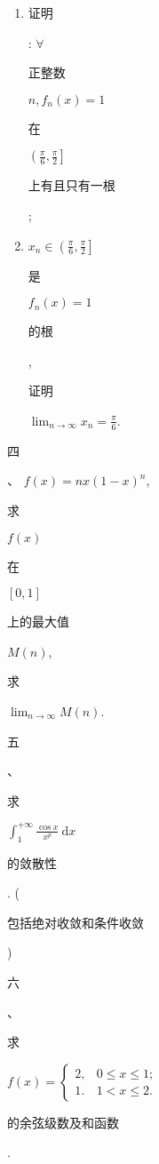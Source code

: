 \documentclass[10pt]{article}
\begin{document}
\begin{enumerate}
  \item \begin{CJK}{UTF8}{mj}证明\end{CJK}: $\forall$ \begin{CJK}{UTF8}{mj}正整数\end{CJK} $n, f_{n}(x)=1$ \begin{CJK}{UTF8}{mj}在\end{CJK} $\left(\frac{\pi}{6}, \frac{\pi}{2}\right]$ \begin{CJK}{UTF8}{mj}上有且只有一根\end{CJK};

  \item $x_{n} \in\left(\frac{\pi}{6}, \frac{\pi}{2}\right]$ \begin{CJK}{UTF8}{mj}是\end{CJK} $f_{n}(x)=1$ \begin{CJK}{UTF8}{mj}的根\end{CJK}, \begin{CJK}{UTF8}{mj}证明\end{CJK} $\lim _{n \rightarrow \infty} x_{n}=\frac{\pi}{6}$.

\end{enumerate}
\begin{CJK}{UTF8}{mj}四\end{CJK}、 $f(x)=n x(1-x)^{n}$, \begin{CJK}{UTF8}{mj}求\end{CJK} $f(x)$ \begin{CJK}{UTF8}{mj}在\end{CJK} $[0,1]$ \begin{CJK}{UTF8}{mj}上的最大值\end{CJK} $M(n)$, \begin{CJK}{UTF8}{mj}求\end{CJK} $\lim _{n \rightarrow \infty} M(n)$.

\begin{CJK}{UTF8}{mj}五\end{CJK}、\begin{CJK}{UTF8}{mj}求\end{CJK} $\int_{1}^{+\infty} \frac{\cos x}{x^{p}} \mathrm{~d} x$ \begin{CJK}{UTF8}{mj}的敛散性\end{CJK}. (\begin{CJK}{UTF8}{mj}包括绝对收敛和条件收敛\end{CJK})

\begin{CJK}{UTF8}{mj}六\end{CJK}、\begin{CJK}{UTF8}{mj}求\end{CJK} $f(x)=\left\{\begin{array}{ll}2, & 0 \leqslant x \leqslant 1 ; \\ 1 . & 1<x \leqslant 2 .\end{array}\right.$ \begin{CJK}{UTF8}{mj}的余弦级数及和函数\end{CJK}.
\end{document}
